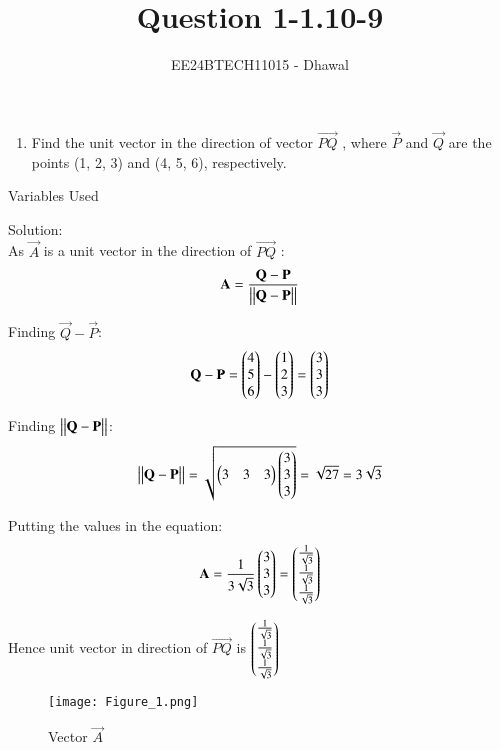 \documentclass[journal]{IEEEtran}
\numberwithin{equation}{enumi}
\numberwithin{figure}{enumi}
\begin{document}

\title{Question 1-1.10-9}
\author{EE24BTECH11015 - Dhawal}
{\let\newpage\relax\maketitle}
\begin{enumerate}
\item Find the unit vector in the direction of vector $\overrightarrow{PQ}$ ,  where $\vec{P}$ and $\vec{Q}$ are the points
(1,  2,  3) and (4,  5,  6),  respectively.
\end{enumerate}

\begin{table}[h!]    
  \centering
  
  \caption{Variables Used}
  \label{tab 1.4.9.2}
\end{table}
Solution:\\

As $\vec{A}$ is a unit vector in the direction of $\overrightarrow{PQ}$ :
\begin{align}
        \mathbf{A}=\frac{\mathbf{Q}-\mathbf{P}}{\begin{vmatrix}\begin{vmatrix}\mathbf{Q}-\mathbf{P}\end{vmatrix}\end{vmatrix}}
\end{align}

Finding $\vec{Q}-\vec{P}$:
\begin{align}
        \mathbf{Q}-\mathbf{P}=\begin{pmatrix}4\\ 5 \\ 6\end{pmatrix}-\begin{pmatrix}1\\2\\3\end{pmatrix}=\begin{pmatrix}3\\3\\3\end{pmatrix}
\end{align}

Finding ${\begin{vmatrix}\begin{vmatrix}\mathbf{Q}-\mathbf{P}\end{vmatrix}\end{vmatrix}}$:
\begin{align}
        {\ensuremath{\begin{vmatrix}\begin{vmatrix}\mathbf{Q}-\mathbf{P}\end{vmatrix}\end{vmatrix}}}= \sqrt{\begin{pmatrix}3&3&3\end{pmatrix}\begin{pmatrix}3\\3\\3\end{pmatrix}}=
        \sqrt{27}=3\sqrt{3}
\end{align}

Putting the values in the equation:
    \begin{align}
         \mathbf{A}=\frac{1}{3\sqrt{3}}\begin{pmatrix}3\\3\\3\end{pmatrix}=\begin{pmatrix}\frac{1}{\sqrt{3}}\\\frac{1}{\sqrt{3}}\\\frac{1}{\sqrt{3}}\end{pmatrix}
    \end{align}

Hence unit vector in direction of $\overrightarrow{PQ}$ is $\begin{pmatrix}\frac{1}{\sqrt{3}}\\\frac{1}{\sqrt{3}}\\\frac{1}{\sqrt{3}}\end{pmatrix}$
\begin{figure}[h!]
   \centering
   \texttt{[image: Figure\_1.png]}
	\caption{Vector $\vec{A}$ }
   \label{stemplot}
\end{figure}
\end{document}
